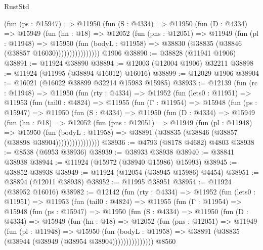 \begin{lexlean}{RustStd}
\begin{coremodule}
                (fun (ps : @15947) =>
                @11950
                  (fun (S : @4334) =>
                  @11950
                    (fun (D : @4334) =>
                    @15949
                      (fun (hn : @18) =>
                      @12052
                        (fun (pns : @12051) =>
                        @11949
                          (fun (pl : @11948) =>
                          @15950
                            (fun (bodyL : @11958) =>
                            @38830 (@38835 (@38846 (@38857 @16030))))))))))))))))
    @1906
@38890 := @38828 (@11941 @1906)
@38891 := @11924 @38890
@38894 := @12003 (@12004 @1906) @32211
@38898 := @11924 (@11995 (@38894 @16012) @16016)
@38899 := @12029 @1906
@38904 := @16021 (@16022 @38899 @32214 @15983 @15985)
@38933 := @12139
    (fun (rc : @11948) =>
    @11950
      (fun (rty : @4334) =>
      @11952
        (fun (lets0 : @11951) =>
        @11953
          (fun (tail0 : @4824) =>
          @11955
            (fun (Γ : @11954) =>
            @15948
              (fun (ps : @15947) =>
              @11950
                (fun (S : @4334) =>
                @11950
                  (fun (D : @4334) =>
                  @15949
                    (fun (hn : @18) =>
                    @12052
                      (fun (pns : @12051) =>
                      @11949
                        (fun (pl : @11948) =>
                        @15950
                          (fun (bodyL : @11958) =>
                          @38891 (@38835 (@38846 (@38857 (@38898 @38904))))))))))))))))
@38936 := @4793 (@8178 @4682) @4803
@38938 := @8538 (@6953 @38936)
@38939 := @38933 @38938
@38940 := @38841 @38938
@38944 := @11924 (@15972 (@38940 @15986) @15993)
@38945 := @38852 @38938
@38949 := @11924 (@12054 (@38945 @15986) @4454)
@38951 := @38894 (@12011 @38938)
@38952 := @11995 @38951
@38954 := @11924 (@38952 @16016)
@38982 := @12142
    (fun (rty : @4334) =>
    @11952
      (fun (lets0 : @11951) =>
      @11953
        (fun (tail0 : @4824) =>
        @11955
          (fun (Γ : @11954) =>
          @15948
            (fun (ps : @15947) =>
            @11950
              (fun (S : @4334) =>
              @11950
                (fun (D : @4334) =>
                @15949
                  (fun (hn : @18) =>
                  @12052
                    (fun (pns : @12051) =>
                    @11949
                      (fun (pl : @11948) =>
                      @15950
                        (fun (bodyL : @11958) =>
                        @38891 (@38835 (@38944 (@38949 (@38954 @38904)))))))))))))))
    @8560

\end{coremodule}
\end{lexlean}
